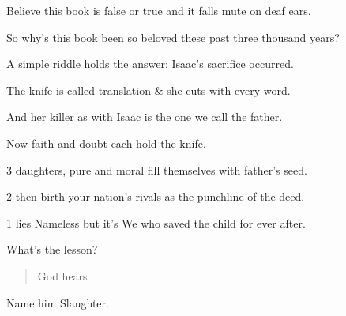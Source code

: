 {
}
{
}
{
	Believe this book is false or true and it falls mute on deaf ears.

	So why's this book been so beloved these past three thousand years?

	A simple riddle holds the answer: Isaac's sacrifice occurred.

	The knife is called translation \& she cuts with every word.

	And her killer as with Isaac is the one we call the father.

	Now faith and doubt each hold the knife.

	\begin{center}
	\end{center}


	3 daughters, pure and moral fill themselves with father's seed.

	2 then birth your nation's rivals as the punchline of the deed.

	1 lies Nameless but it's We who saved the child for ever after.


	What's the lesson?

	\begin{quote}
	 God hears   
	\end{quote}

	Name him \textcolor{black!4}{S}laughter.
}
